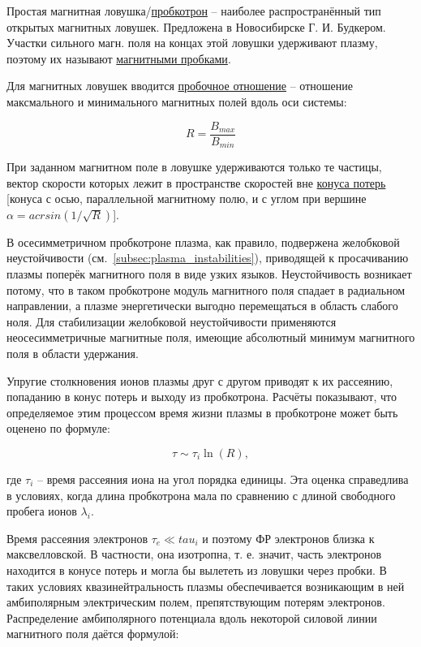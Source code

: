 \documentclass[10pt, a4paper]{article}
\begin{document}
Простая магнитная ловушка/\uline{пробкотрон} -- наиболее распространённый тип открытых магнитных ловушек. Предложена в Новосибирске Г. И. Будкером. Участки сильного магн. поля на концах этой ловушки удерживают плазму, поэтому их называют \uline{магнитными пробками}. 

Для магнитных ловушек вводится \uline{пробочное отношение} -- отношение максмального и минимального магнитных полей вдоль оси системы:

\begin{equation*}
	R = \frac{B_{max}}{B_{min}}
\end{equation*}

При заданном магнитном поле в ловушке удерживаются только те частицы, вектор скорости которых лежит в пространстве скоростей вне \uline{конуса потерь} [конуса с осью, параллельной магнитному полю, и с углом при вершине $\alpha = acrsin(1/\sqrt{R})$].

В осесимметричном пробкотроне плазма, как правило, подвержена желобковой неустойчивости (см.~\ref{subsec:plasma_instabilities}), приводящей к просачиванию плазмы поперёк магнитного поля в виде узких языков. Неустойчивость возникает потому, что в таком пробкотроне модуль магнитного поля спадает в радиальном направлении, а плазме энергетически выгодно перемещаться в область слабого ноля. Для стабилизации желобковой неустойчивости применяются неосесимметричные магнитные поля, имеющие абсолютный минимум магнитного поля в области удержания. 

Упругие столкновения ионов плазмы друг с другом приводят к их рассеянию, попаданию в конус потерь и выходу из пробкотрона. Расчёты показывают, что определяемое этим процессом время жизни плазмы в пробкотроне может быть оценено по формуле:

\begin{equation*}
	\tau \sim \tau_i \ln(R),
\end{equation*}

где $\tau_i$ -- время рассеяния иона на угол порядка единицы. Эта оценка справедлива в условиях, когда длина пробкотрона мала по сравнению с длиной свободного пробега ионов $\lambda_i$.

Время рассеяния электронов $\tau_e \ll tau_i$ и поэтому ФР электронов близка к максвелловской. В частности, она изотропна, т. е. значит, часть электронов находится в конусе потерь и могла бы вылететь из ловушки через пробки. В таких условиях квазинейтральность плазмы обеспечивается возникающим в ней амбиполярным электрическим полем, препятствующим потерям электронов. Распределение амбиполярного потенциала вдоль некоторой силовой линии магнитного поля даётся формулой:
\end{document}
